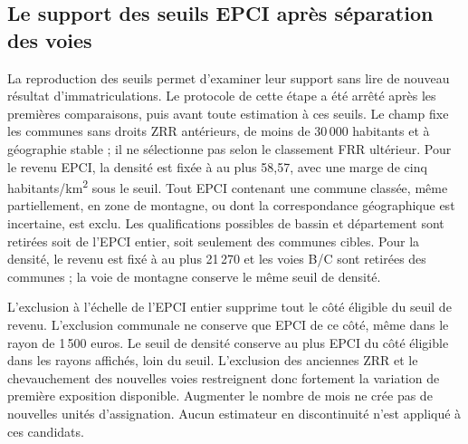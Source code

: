 \subsection{Le support des seuils EPCI après séparation des voies}
La reproduction des seuils permet d’examiner leur support sans lire de nouveau résultat d’immatriculations. Le protocole de cette étape a été arrêté après les premières comparaisons, puis avant toute estimation à ces seuils. Le champ fixe les communes sans droits ZRR antérieurs, de moins de 30\,000 habitants et à géographie stable ; il ne sélectionne pas selon le classement FRR ultérieur. Pour le revenu EPCI, la densité est fixée à au plus 58,57, avec une marge de cinq habitants/km\textsuperscript{2} sous le seuil. Tout EPCI contenant une commune classée, même partiellement, en zone de montagne, ou dont la correspondance géographique est incertaine, est exclu. Les qualifications possibles de bassin et département sont retirées soit de l’EPCI entier, soit seulement des communes cibles. Pour la densité, le revenu est fixé à au plus 21\,270 et les voies B/C sont retirées des communes ; la voie de montagne conserve le même seuil de densité.

\begin{table}[htbp]\centering\small\caption{Support des candidats EPCI sans qualification alternative}\label{tab:rd_support}\end{table}

L’exclusion à l’échelle de l’EPCI entier supprime tout le côté éligible du seuil de revenu. L’exclusion communale ne conserve que \IncomeRDEligibleN{} EPCI de ce côté, même dans le rayon de 1\,500 euros. Le seuil de densité conserve au plus \DensityRDEligibleN{} EPCI du côté éligible dans les rayons affichés, loin du seuil. L’exclusion des anciennes ZRR et le chevauchement des nouvelles voies restreignent donc fortement la variation de première exposition disponible. Augmenter le nombre de mois ne crée pas de nouvelles unités d’assignation. Aucun estimateur en discontinuité n’est appliqué à ces candidats.

